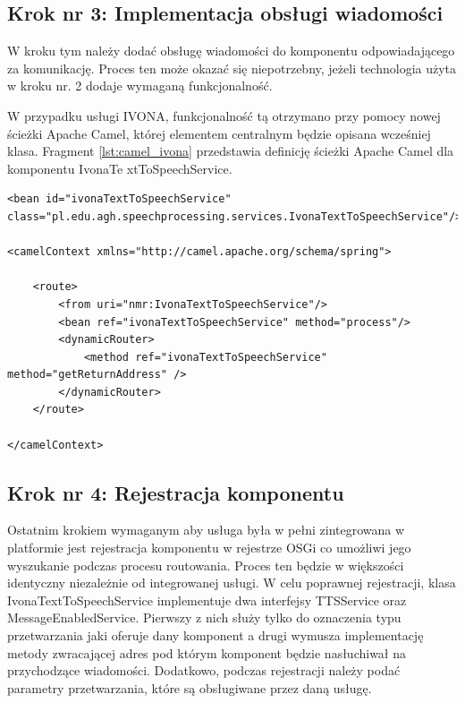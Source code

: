 \subsection {Krok nr 3: Implementacja obsługi wiadomości}

W kroku tym należy dodać obsługę wiadomości do komponentu odpowiadającego za komunikację. Proces ten może okazać się niepotrzebny, jeżeli technologia użyta w kroku nr. 2 dodaje wymaganą funkcjonalność.

W przypadku usługi IVONA, funkcjonalność tą otrzymano przy pomocy nowej ścieżki Apache Camel, której elementem centralnym będzie opisana wcześniej klasa. Fragment \ref{lst:camel_ivona} przedstawia definicję ścieżki Apache Camel dla komponentu IvonaTe	xtToSpeechService.

\lstset{language=XML, tabsize=4, caption=Ścieżka Apache Camel dla komponentu IvonaTextToSpeechService.,label=lst:camel_ivona}

\begin{center}
\begin{lstlisting}
<bean id="ivonaTextToSpeechService" class="pl.edu.agh.speechprocessing.services.IvonaTextToSpeechService"/>

<camelContext xmlns="http://camel.apache.org/schema/spring">

	<route>
		<from uri="nmr:IvonaTextToSpeechService"/>
		<bean ref="ivonaTextToSpeechService" method="process"/>
		<dynamicRouter>
			<method ref="ivonaTextToSpeechService" method="getReturnAddress" />
		</dynamicRouter>
	</route>

</camelContext>
\end{lstlisting}
\end{center}

\subsection {Krok nr 4: Rejestracja komponentu}

Ostatnim krokiem wymaganym aby usługa była w pełni zintegrowana w platformie jest rejestracja komponentu w rejestrze OSGi co umożliwi jego wyszukanie podczas procesu routowania. Proces ten będzie w większości identyczny niezależnie od integrowanej usługi.
W celu poprawnej rejestracji, klasa IvonaTextToSpeechService implementuje dwa interfejsy TTSService oraz MessageEnabledService. Pierwszy z nich służy tylko do oznaczenia typu przetwarzania jaki oferuje dany komponent a drugi wymusza implementację metody zwracającej adres pod którym komponent będzie nasłuchiwał na przychodzące wiadomości. Dodatkowo, podczas rejestracji należy podać parametry przetwarzania, które są obsługiwane przez daną usługę.

